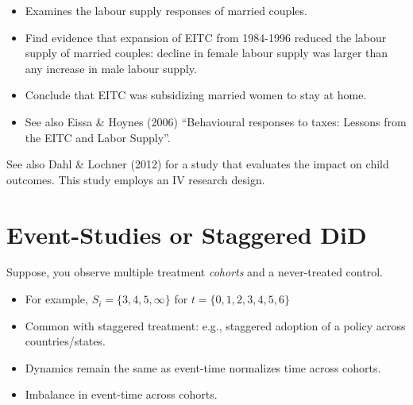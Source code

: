 \documentclass[
  letterpaper,
  DIV=11,
  numbers=noendperiod]{scrreprt}
\providecommand{\tightlist}{%
  \setlength{\itemsep}{0pt}\setlength{\parskip}{0pt}}\usepackage{longtable,booktabs,array}
\theoremstyle{definition}
\theoremstyle{remark}
\begin{document}
\begin{tcolorbox}[enhanced jigsaw, breakable, colframe=quarto-callout-note-color-frame, toptitle=1mm, toprule=.15mm, opacitybacktitle=0.6, opacityback=0, rightrule=.15mm, titlerule=0mm, colback=white, bottomtitle=1mm, title={Eissa \& Hoynes (JPub, 2004)}, arc=.35mm, coltitle=black, colbacktitle=quarto-callout-note-color!10!white, leftrule=.75mm, bottomrule=.15mm, left=2mm]

\begin{itemize}
\tightlist
\item
  Examines the labour supply responses of married couples.
\item
  Find evidence that expansion of EITC from 1984-1996 reduced the labour
  supply of married couples: decline in female labour supply was larger
  than any increase in male labour supply.
\item
  Conclude that EITC was subsidizing married women to stay at home.
\item
  See also Eissa \& Hoynes (2006) ``Behavioural responses to taxes:
  Lessons from the EITC and Labor Supply''.
\end{itemize}

\end{tcolorbox}

See also Dahl \& Lochner (2012) for a study that evaluates the impact on
child outcomes. This study employs an IV research design.

\hfill\break
\hfill\break

\hypertarget{event-studies-or-staggered-did}{%
\chapter{Event-Studies or Staggered
DiD}\label{event-studies-or-staggered-did}}

Suppose, you observe multiple treatment \emph{cohorts} and a
never-treated control.

\begin{itemize}
\tightlist
\item
  For example, \(S_i = \{3,4,5,\infty\}\) for \(t=\{0,1,2,3,4,5,6\}\)
\item
  Common with staggered treatment: e.g., staggered adoption of a policy
  across countries/states.
\item
  Dynamics remain the same as event-time normalizes time across cohorts.
\item
  Imbalance in event-time across cohorts.
\end{itemize}
\end{document}
